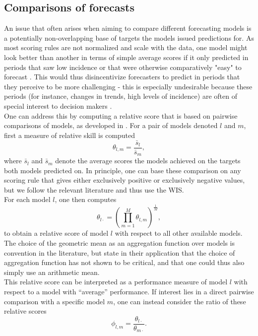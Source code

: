 \subsection{Comparisons of forecasts} \label{sub:pairwise_comps}
An issue that often arises when aiming to compare different forecasting models is a potentially non-overlapping base of targets the models issued predictions for. As most scoring rules are not normalized and scale with the data, %
one model might look better than another in terms of simple average scores if it only predicted in periods that saw low incidence or that were otherwise comparatively "easy" to forecast \citep{cramer_evaluation_2022}. This would thus disincentivize forecasters to predict in periods that they perceive to be more challenging - this is especially undesirable because these periods (for instance, changes in trends, high levels of incidence) are often of special interest to decision makers \citep{reich_predictability_2021}.\\
One can address this by computing a relative score that is based on pairwise comparisons of models, as developed in \cite{cramer_evaluation_2022}. For a pair of models denoted $l$ and $m$, first a measure of relative skill is computed
\[
\theta_{l,m} = \frac{\bar{s}_{l}}{\bar{s}_{m}},
\]
where $\bar{s}_{l}$ and $\bar{s}_{m}$ denote the average scores the models achieved on the targets both models predicted on. In principle, one can base these comparison on any scoring rule that gives either exclusively positive or exclusively negative values, but we follow the relevant literature and thus use the WIS.\\
For each model $l$, one then computes 
\[
\theta_{l\cdot} = \left(\prod_{m = 1}^{M}\theta_{l,m} \right)^{\frac{1}{M}},
\]to obtain a relative score of model $l$ with respect to all other available models. The choice of the geometric mean as an aggregation function over models is convention in the literature, but \cite{ray_comparing_2022} state in their application that the choice of aggregation function has not shown to be critical, and that one could thus also simply use an arithmetic mean. \\
This relative score can be interpreted as a performance measure of model $l$ with respect to a model with ``average'' performance. If interest lies in a direct pairwise comparison with a specific model $m$, one can instead consider the ratio of these relative scores
\begin{equation} \label{eq:mean_score_ratio}
\phi_{l,m} = \frac{\theta_{l\cdot}}{\theta_{m\cdot}}. 
\end{equation}

